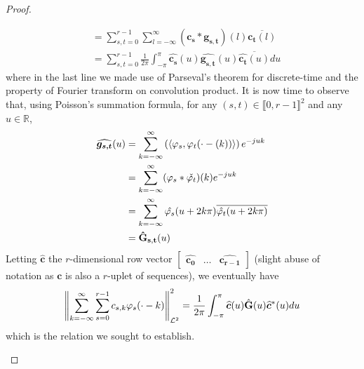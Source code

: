 \begin{proof}
\begin{enumerate}
\begin{align*}
	& = \sum_{s,t=0}^{r-1} \sum_{l=-\infty}^{\infty}  \left(\bm{c_{s}}*\bm{g_{s,t}}\right)(l)\overline{\bm{c_{t}}(l)} \\
	& = \sum_{s,t=0}^{r-1} \frac{1}{2\pi} \int_{-\pi}^{\pi}  \widehat{\bm{c_{s}}}(u)\widehat{\bm{g_{s,t}}}(u) 
	\overline{\widehat{\bm{c_{t}}}(u)} du
      \end{align*}
      where in the last line we made use of Parseval's theorem for discrete-time and the property of Fourier transform on 
      convolution product. It is now time to observe that, using Poisson's summation formula, for any $(s,t) \in 
      {\llbracket0, r-1\rrbracket}^2$ and any $u \in \mathbb{R}$,
      \begin{align*}
	\widehat{\bm{g_{s,t}}}(u) &= \sum_{k=-\infty}^{\infty} \left(\langle \varphi_s, \varphi_t(\cdot-(k))\rangle\right) 
	e^{-juk} \\
	& = \sum_{k=-\infty}^{\infty} (\varphi_s * \check{\varphi_t})(k) e^{-juk} \\
	& = \sum_{k=-\infty}^{\infty} \hat{\varphi_s}(u+2k\pi)\overline{\hat{\varphi_t}(u+2k\pi)} \\
	& = \mathbf{\hat{G}_{s,t}}(u)
      \end{align*}
      Letting $\hat{\bm{c}}$ the $r$-dimensional row vector $\begin{bmatrix} \widehat{\bm{c_0}} & \hdots & 
      \widehat{\bm{c_{r-1}}} \end{bmatrix}$ (slight abuse of notation as $\bm{c}$ is also a $r$-uplet of sequences), we 
      eventually have
      \begin{equation}\label{eq:rel-fourier}
	{\left\| \sum_{k=-\infty}^{\infty} \sum_{s=0}^{r-1} c_{s,k} \varphi_s(\cdot-k)\right\|}_{\mathcal{L}^2}^2
	= \frac{1}{2\pi} \int_{-\pi}^{\pi}  \widehat{\bm{c}}(u)\hat{\mathbf{G}}(u)\widehat{\bm{c}}^*(u) du
      \end{equation}
      which is the relation we sought to establish.  


\end{enumerate}
\end{proof}
